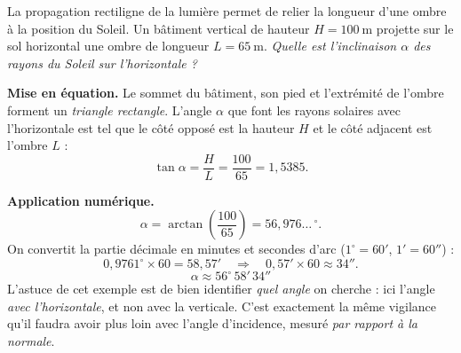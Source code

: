 \documentclass[11pt,a4paper]{article}
\begin{document}
\begin{exemple}
La propagation rectiligne de la lumière permet de relier la longueur d'une ombre à la position
du Soleil. Un bâtiment vertical de hauteur $H = \SI{100}{\metre}$ projette sur le sol horizontal
une ombre de longueur $L = \SI{65}{\metre}$. \emph{Quelle est l'inclinaison $\alpha$ des rayons du
Soleil sur l'horizontale ?}

\smallskip
\begin{center}
\end{center}

\textbf{Mise en équation.} Le sommet du bâtiment, son pied et l'extrémité de l'ombre forment un
\emph{triangle rectangle}. L'angle $\alpha$ que font les rayons solaires avec l'horizontale est
tel que le côté opposé est la hauteur $H$ et le côté adjacent est l'ombre $L$ :
\[ \tan\alpha = \frac{H}{L} = \frac{100}{65} = 1{,}5385. \]

\textbf{Application numérique.}
\[ \alpha = \arctan\!\left(\frac{100}{65}\right) = 56{,}976\ldots\,^\circ. \]
On convertit la partie décimale en minutes et secondes d'arc (\(1^\circ = 60'\), \(1' = 60''\)) :
\[ 0{,}9761^\circ \times 60 = 58{,}57' \quad\Rightarrow\quad 0{,}57' \times 60 \approx 34''. \]
\[ \boxed{\alpha \approx 56^\circ\,58'\,34''} \]
L'astuce de cet exemple est de bien identifier \emph{quel angle} on cherche : ici l'angle
\emph{avec l'horizontale}, et non avec la verticale. C'est exactement la même vigilance qu'il faudra
avoir plus loin avec l'angle d'incidence, mesuré \emph{par rapport à la normale}.
\end{exemple}
\end{document}
